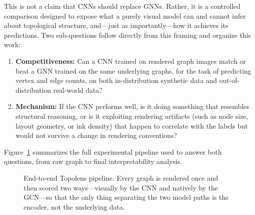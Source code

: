 \documentclass[11pt,letterpaper]{article}
\numberwithin{equation}{section}
\numberwithin{figure}{section}
\numberwithin{table}{section}
\begin{document}
This is not a claim that CNNs should replace GNNs. Rather, it is a controlled comparison designed to expose what a purely visual model can and cannot infer about topological structure, and---just as importantly---how it achieves its predictions. Two sub-questions follow directly from this framing and organize this work:
\begin{enumerate}
    \item \textbf{Competitiveness:} Can a CNN trained on rendered graph images match or beat a GNN trained on the same underlying graphs, for the task of predicting vertex and edge counts, on both in-distribution synthetic data and out-of-distribution real-world data?
    \item \textbf{Mechanism:} If the CNN performs well, is it doing something that resembles structural reasoning, or is it exploiting rendering artifacts (such as node size, layout geometry, or ink density) that happen to correlate with the labels but would not survive a change in rendering conventions?
\end{enumerate}

Figure~\ref{fig:pipeline_overview} summarizes the full experimental pipeline used to answer both questions, from raw graph to final interpretability analysis.

\begin{figure}[htbp]
\centering
{}
\caption{End-to-end Topolens pipeline. Every graph is rendered once and then scored two ways---visually by the CNN and natively by the GCN---so that the only thing separating the two model paths is the encoder, not the underlying data.}
\label{fig:pipeline_overview}
\end{figure}
\end{document}
